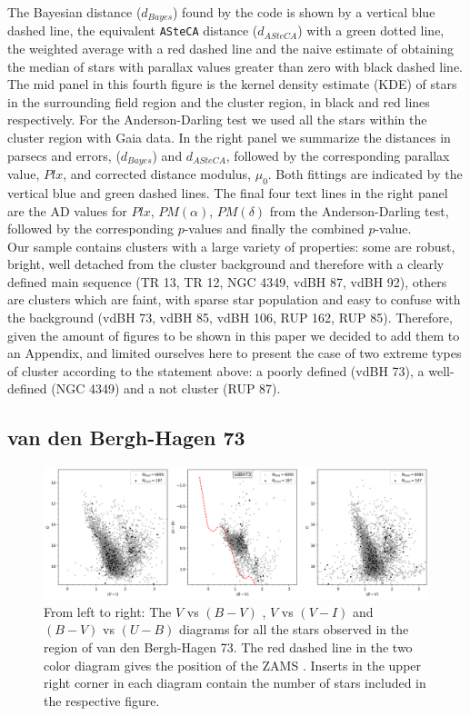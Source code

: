 \documentclass[draft]{aa}
\begin{document}
%
The Bayesian distance ($d_{Bayes}$) found by the code is shown by a vertical
blue dashed line, the equivalent \texttt{ASteCA} distance ($d_{ASteCA}$) with a
green dotted line, the weighted average with a red dashed line and the naive
estimate of obtaining the median of stars with parallax values greater than
zero with black dashed line.
%
The mid panel in this fourth figure is the kernel density estimate (KDE) of
stars in the surrounding field region and the cluster region, in black and red
lines respectively. For the Anderson-Darling test we used all the
stars within the cluster region with Gaia data. In the right panel we
summarize the distances in parsecs and errors, ($d_{Bayes}$)
and $d_{ASteCA}$, followed by the corresponding parallax
value, $Plx$, and corrected distance modulus, $\mu_0$. Both
fittings are indicated by the vertical blue and green dashed lines. The final
four text lines in the right panel are the AD values for $Plx$, $PM(\alpha)$,
$PM(\delta)$ from the Anderson-Darling test, followed by the corresponding
$p$-values and finally the combined $p$-value.\\

Our sample contains clusters with a large variety of properties: some are
robust, bright, well detached from the cluster background and therefore with a
clearly defined main sequence (TR 13, TR 12, NGC 4349, vdBH 87, vdBH 92),
others are clusters which are faint, with sparse star population and easy to
confuse with the background (vdBH 73, vdBH 85, vdBH 106, RUP 162, RUP 85).
Therefore, given the amount of figures to be shown in this paper we decided to
add them to an Appendix, and limited ourselves here to present
the case of two extreme types of cluster according to the statement above: a
poorly defined (vdBH 73), a well-defined (NGC 4349) and a not cluster 
(RUP 87).


\subsection{van den Bergh-Hagen 73}

\begin{figure}[ht]
    \centering
    \includegraphics[width=\hsize]{../figs/obs_vdBH73.png}
    \caption{From left to right: The $V$ vs $(B-V)$ , $V$ vs $(V-I)$ and
    $(B-V)$ vs $(U-B)$ diagrams for all the stars observed in the region of van
    den Bergh-Hagen 73.
    The red dashed line in the two color diagram gives the position of the ZAMS
    \citep{Aller1982}. Inserts in the upper right corner in each
    diagram contain the number of stars included in the respective figure.}
    \label{fig3}
\end{figure}
\end{document}

